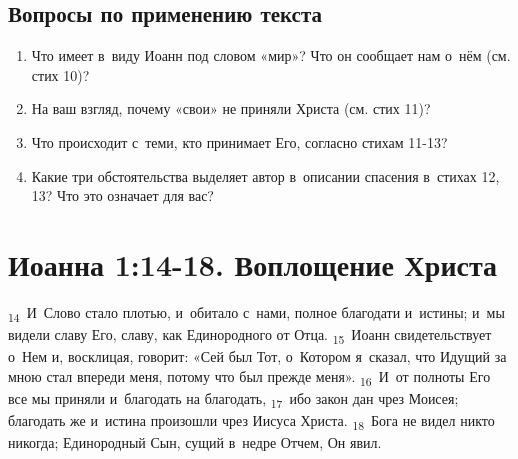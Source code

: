 \documentclass[a4paper,12pt]{article}
\begin{document}
\subsection*{Вопросы по применению текста} 
\begin{enumerate}
    \item Что имеет в~виду Иоанн под словом «мир»? Что он сообщает нам о~нём (см. стих 10)? 
    
    \myline
    
    \myline

    \item На ваш взгляд, почему «свои» не приняли Христа (см. стих 11)? 
    
    \myline
    
    \myline

    \item Что происходит с~теми, кто принимает Его, согласно стихам 11-13? 
    
    \myline
    
    \myline

    \item Какие три обстоятельства выделяет автор в~описании спасения в~стихах 12, 13? Что это означает для вас?
    
    \myline
    
    \myline

\end{enumerate}



\section{Иоанна 1:14-18. Воплощение Христа}

\textsubscript{14}~И~Слово стало плотью, и~обитало с~нами, полное благодати и~истины; и~мы видели славу Его, славу, как Единородного от Отца.
\textsubscript{15}~Иоанн свидетельствует о~Нем и, восклицая, говорит: «Сей был Тот, о~Котором я~сказал, что Идущий за мною стал впереди меня, потому что был прежде меня».
\textsubscript{16}~И~от полноты Его все мы приняли и~благодать на благодать,
\textsubscript{17}~ибо закон дан чрез Моисея; благодать же и~истина произошли чрез Иисуса Христа.
\textsubscript{18}~Бога не видел никто никогда; Единородный Сын, сущий в~недре Отчем, Он явил.
\end{document}
